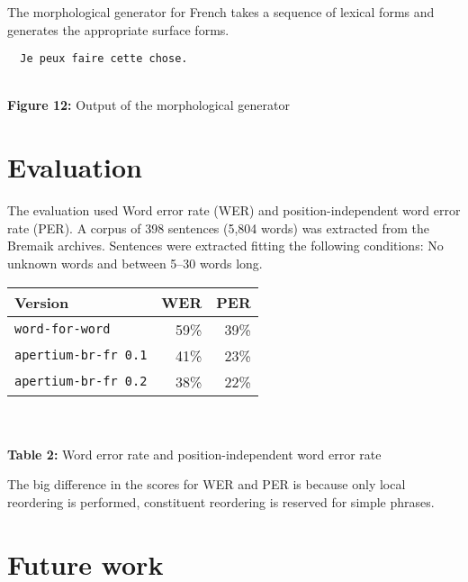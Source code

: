 \documentclass[a0,landscape]{a0poster}
\begin{document}
\begin{multicols}{4}
\noindent
The morphological generator for French takes a sequence of lexical forms and generates the appropriate surface forms. 
\vspace{0.3cm}
\begin{center}
\begin{minipage}[b]{26cm}
\begin{small}
\begin{verbatim}
  Je peux faire cette chose.
\end{verbatim}
\end{small}
\end{minipage}\\
\vspace{0.3cm}
\textbf{Figure 12:} Output of the morphological generator
\end{center}

\section{Evaluation} 

\noindent
The evaluation used Word error rate (WER) and position-independent word error rate (PER).
A corpus of 398 sentences (5,804 words) was extracted from the Bremaik archives. Sentences were extracted
fitting the following conditions: No unknown words and between 5--30 words long. \\

  \begin{center}
  \begin{tabular}{l|r|r}
   \hline
   {\bf Version }   & {\bf WER}  & {\bf PER}  \\
   \hline 
   \texttt{{\small word-for-word}} & 59\% & 39\% \\
   \texttt{{\small apertium-br-fr 0.1}}        & 41\% & 23\% \\
   \texttt{{\small apertium-br-fr 0.2}}        & 38\% & 22\% \\
   \hline
  \end{tabular}\\
~\\
    \textbf{Table 2:} Word error rate and position-independent word error rate 
  \end{center}
\vspace{0.5cm}
The big difference in the scores for WER and PER is because only 
local reordering is performed, constituent reordering is reserved for simple phrases.

\section{Future work}


\end{multicols}
\end{document}
